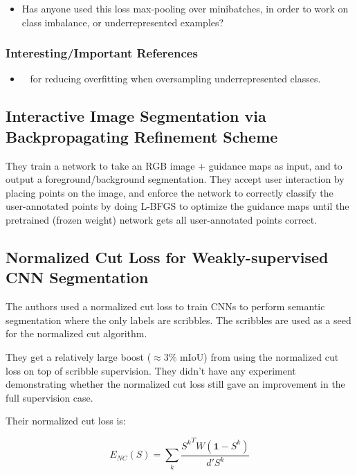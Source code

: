 \documentclass[a4paper, 12pt]{article}
\begin{document}
\begin{itemize}
        \item Has anyone used this loss max-pooling over minibatches, in order
                to work on class imbalance, or underrepresented examples?
\end{itemize}


\subsubsection{Interesting/Important References}

\begin{itemize}
        \item~\cite{bunkhumpornpat2009safe} for reducing overfitting when
                oversampling underrepresented classes.
\end{itemize}


\subsection{Interactive Image Segmentation via Backpropagating Reﬁnement
            Scheme~\cite{jang2019interactive}}

They train a network to take an RGB image + guidance maps as input, and to
output a foreground/background segmentation. They accept user interaction by
placing points on the image, and enforce the network to correctly classify the
user-annotated points by doing L-BFGS to optimize the guidance maps until the
pretrained (frozen weight) network gets all user-annotated points correct.


\subsection{Normalized Cut Loss for Weakly-supervised CNN
            Segmentation~\cite{tang2018normalized}}

The authors used a normalized cut loss to train CNNs to perform semantic
segmentation where the only labels are scribbles. The scribbles are used as a
seed for the normalized cut algorithm.

They get a relatively large boost ($\approx 3\%$ mIoU) from using the
normalized cut loss on top of scribble supervision. They didn't have any
experiment demonstrating whether the normalized cut loss still gave an
improvement in the full supervision case.

Their normalized cut loss is:

\begin{equation}
        E_{NC}(S) = \sum_k \frac{{S^k}^T W (\mathbf{1} - S^k)}{d' S^k}
\end{equation}
\end{document}
